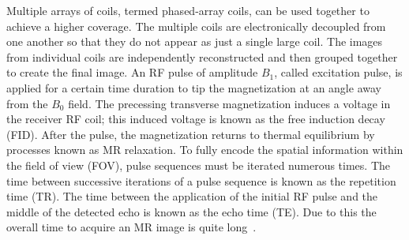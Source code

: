 Multiple arrays of coils, termed phased-array coils, can be used together to achieve a higher coverage. The multiple coils are electronically decoupled from one another so that they do not appear as just a single large coil. The images from individual coils are independently reconstructed and then grouped together to create the final image. An RF pulse of amplitude $B_1$, called excitation pulse, is applied for a certain time duration to tip the magnetization at an angle away from the $B_0$ field. The precessing transverse magnetization induces a voltage in the receiver RF coil; this induced voltage is known as the free induction decay (FID). After the pulse, the magnetization returns to thermal equilibrium by processes known as MR relaxation. To fully encode the spatial information within the field of view (FOV), pulse sequences must be iterated numerous times. The time between successive iterations of a pulse sequence is known as the repetition time (TR). The time between the application of the initial RF pulse and the middle of the detected echo is known as the echo time (TE). Due to this the overall time to acquire an MR image is quite long~\cite{Serai2021}.\\

